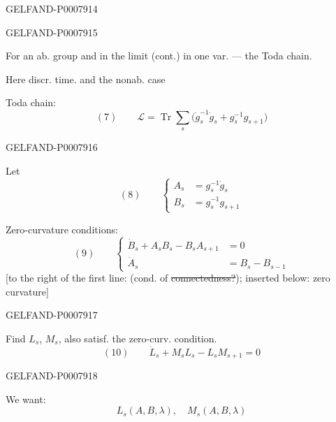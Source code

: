 \begin{GelfandAdjacentEvidence}{GELFAND-P000791}{4}

\end{GelfandAdjacentEvidence}
\begin{GelfandAdjacentEvidence}{GELFAND-P000791}{5}


For an ab. group and in the limit (cont.) in one var. --- the Toda chain.

Here discr. time. and the nonab. case

Toda chain:
\[
(7)\qquad \mathcal{L}=\operatorname{Tr}\sum_s
\bigl(\dot{g}_s^{-1}\dot{g}_s+g_s^{-1}g_{s+1}\bigr)
\]
\end{GelfandAdjacentEvidence}
\begin{GelfandAdjacentEvidence}{GELFAND-P000791}{6}


Let
\[
(8)\qquad\left\{\begin{aligned}
A_s&=g_s^{-1}\dot{g}_s\\
B_s&=g_s^{-1}g_{s+1}
\end{aligned}\right.
\]

Zero-curvature conditions:
\[
(9)\qquad\left\{\begin{aligned}
\dot{B}_s+A_sB_s-B_sA_{s+1}&=0\\
\dot{A}_s&=B_s-B_{s-1}
\end{aligned}\right.
\]
[to the right of the first line: (cond. of \sout{connectedness?}); inserted below: zero curvature]
\end{GelfandAdjacentEvidence}
\begin{GelfandAdjacentEvidence}{GELFAND-P000791}{7}


Find \(L_s\), \(M_s\), also satisf. the zero-curv. condition.
\[
(10)\qquad\dot{L}_s+M_sL_s-L_sM_{s+1}=0
\]
\end{GelfandAdjacentEvidence}
\begin{GelfandAdjacentEvidence}{GELFAND-P000791}{8}


We want:
\[
L_s(A,B,\lambda),\quad M_s(A,B,\lambda)
\]
\end{GelfandAdjacentEvidence}



